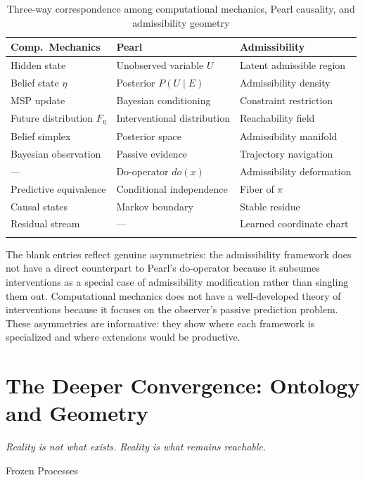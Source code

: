 \documentclass[12pt, a4paper]{article}
\theoremstyle{plain}
\theoremstyle{definition}
\theoremstyle{remark}
\begin{document}
\begin{center}
\begin{longtable}{p{} p{} p{}}
\toprule
\textbf{Comp.\ Mechanics} & \textbf{Pearl} & \textbf{Admissibility} \\
\midrule
\endhead
Hidden state & Unobserved variable $U$ & Latent admissible region \\
Belief state $\eta$ & Posterior $P(U \mid E)$ & Admissibility density \\
MSP update & Bayesian conditioning & Constraint restriction \\
Future distribution $F_\eta$ & Interventional distribution & Reachability field \\
Belief simplex & Posterior space & Admissibility manifold \\
Bayesian observation & Passive evidence & Trajectory navigation \\
--- & Do-operator $do(x)$ & Admissibility deformation \\
Predictive equivalence & Conditional independence & Fiber of $\pi$ \\
Causal states & Markov boundary & Stable residue \\
Residual stream & --- & Learned coordinate chart \\
\bottomrule
\caption{Three-way correspondence among computational mechanics, Pearl causality,
and admissibility geometry}
\label{tab:threeway}
\end{longtable}
\end{center}

The blank entries reflect genuine asymmetries: the admissibility framework
does not have a direct counterpart to Pearl's do-operator because it
subsumes interventions as a special case of admissibility modification rather
than singling them out. Computational mechanics does not have a
well-developed theory of interventions because it focuses on the observer's
passive prediction problem. These asymmetries are informative: they show
where each framework is specialized and where extensions would be productive.

\section{The Deeper Convergence: Ontology and Geometry}

\epigraph{\textit{Reality is not what exists. Reality is what remains
reachable.}}{Frozen Processes}
\end{document}
